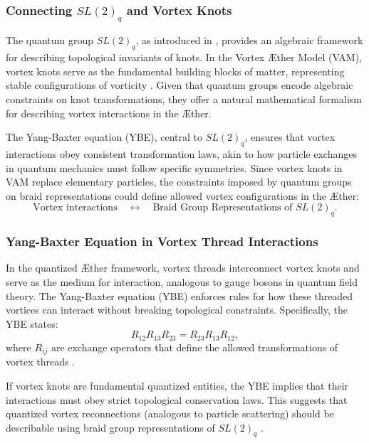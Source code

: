 \documentclass[a4paper,10pt]{article}
\begin{document}
\subsubsection*{Connecting $SL(2)_q$ and Vortex Knots}
The quantum group $SL(2)_q$, as introduced in \cite{goulding_knot_2010}, provides an algebraic framework for describing topological invariants of knots. In the Vortex Æther Model (VAM), vortex knots serve as the fundamental building blocks of matter, representing stable configurations of vorticity \cite{iskandarani_vortex_2025}. Given that quantum groups encode algebraic constraints on knot transformations, they offer a natural mathematical formalism for describing vortex interactions in the Æther.

The Yang-Baxter equation (YBE), central to $SL(2)_q$, ensures that vortex interactions obey consistent transformation laws, akin to how particle exchanges in quantum mechanics must follow specific symmetries. Since vortex knots in VAM replace elementary particles, the constraints imposed by quantum groups on braid representations could define allowed vortex configurations in the Æther:
\begin{equation*}
    \text{Vortex interactions} \quad \longleftrightarrow \quad \text{Braid Group Representations of } SL(2)_q.
\end{equation*}

\subsubsection*{Yang-Baxter Equation in Vortex Thread Interactions}
In the quantized Æther framework, vortex threads interconnect vortex knots and serve as the medium for interaction, analogous to gauge bosons in quantum field theory. The Yang-Baxter equation (YBE) enforces rules for how these threaded vortices can interact without breaking topological constraints. Specifically, the YBE states:
\begin{equation*}
    R_{12} R_{13} R_{23} = R_{23} R_{13} R_{12},
\end{equation*}
where $R_{ij}$ are exchange operators that define the allowed transformations of vortex threads \cite{yang_baxter_eq}.

If vortex knots are fundamental quantized entities, the YBE implies that their interactions must obey strict topological conservation laws. This suggests that quantized vortex reconnections (analogous to particle scattering) should be describable using braid group representations of $SL(2)_q$ \cite{sl2q_representations}.
\end{document}
